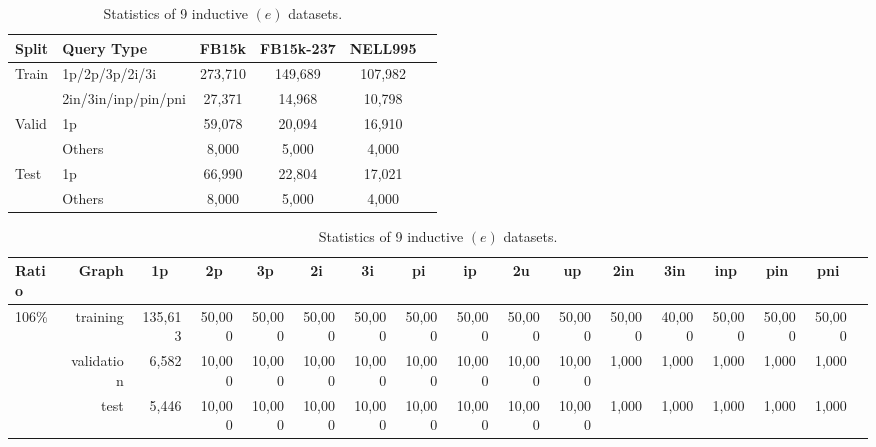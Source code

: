 \begin{table}[!ht]
\centering
    \caption{Statistics of 3 transductive datasets}
    \begin{adjustbox}{max width=0.48\textwidth}
        \begin{tabular}{llcccc}
            \toprule
            \bf{Split} & \bf{Query Type} & \bf{FB15k} & \bf{FB15k-237} & \bf{NELL995} \\
            \midrule
            \multirow{2}{*}{Train}
            & 1p/2p/3p/2i/3i & 273,710 & 149,689 & 107,982 \\
            & 2in/3in/inp/pin/pni & 27,371 & 14,968 & 10,798 \\
            \midrule
            \multirow{2}{*}{Valid}
            & 1p & 59,078 & 20,094 & 16,910 \\
            & Others & 8,000 & 5,000 & 4,000 \\
            \midrule
            \multirow{2}{*}{Test}
            & 1p & 66,990 & 22,804 & 17,021 \\
            & Others & 8,000 & 5,000 & 4,000 \\
            \bottomrule
        \end{tabular}
    \end{adjustbox}
    \label{tab:app_transd_queries}
%
\centering
\caption{Statistics of 9 inductive $(e)$ datasets.}
\label{tab:app_inductive_e_queries}
\begin{adjustbox}{width=\textwidth}
\begin{tabular}{lrrrrrrrrrrrrrrrr}\toprule
Ratio & Graph & \multicolumn{1}{c}{\textbf{1p}} & \multicolumn{1}{c}{\textbf{2p}} & \multicolumn{1}{c}{\textbf{3p}} & \multicolumn{1}{c}{\textbf{2i}} & \multicolumn{1}{c}{\textbf{3i}} & \multicolumn{1}{c}{\textbf{pi}} & \multicolumn{1}{c}{\textbf{ip}} & \multicolumn{1}{c}{\textbf{2u}} & \multicolumn{1}{c}{\textbf{up}} & \multicolumn{1}{c}{\textbf{2in}} & \multicolumn{1}{c}{\textbf{3in}} & \multicolumn{1}{c}{\textbf{inp}} & \multicolumn{1}{c}{\textbf{pin}} & \multicolumn{1}{c}{\textbf{pni}} \\\midrule
\multirow{3}{*}{106\%} &training & 135,613 &50,000 &50,000 &50,000 &50,000 &50,000 &50,000 &50,000 &50,000 &50,000 &40,000 &50,000 &50,000 &50,000 \\
&validation & 6,582 &10,000 &10,000 &10,000 &10,000 &10,000 &10,000 &10,000 &10,000 &1,000 &1,000 &1,000 &1,000 &1,000 \\
&test & 5,446 &10,000 &10,000 &10,000 &10,000 &10,000 &10,000 &10,000 &10,000 &1,000 &1,000 &1,000 &1,000 &1,000 \\ \midrule

\end{tabular}
\end{adjustbox}
\end{table}
